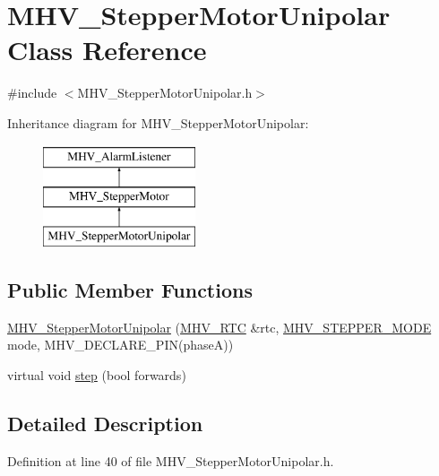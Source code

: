 \hypertarget{class_m_h_v___stepper_motor_unipolar}{
\section{\-M\-H\-V\-\_\-\-Stepper\-Motor\-Unipolar \-Class \-Reference}
\label{class_m_h_v___stepper_motor_unipolar}
}


{\ttfamily \#include $<$\-M\-H\-V\-\_\-\-Stepper\-Motor\-Unipolar.\-h$>$}

\-Inheritance diagram for \-M\-H\-V\-\_\-\-Stepper\-Motor\-Unipolar\-:\begin{figure}[H]
\begin{center}
\leavevmode
\includegraphics[height=3.000000cm]{class_m_h_v___stepper_motor_unipolar}
\end{center}
\end{figure}
\subsection*{\-Public \-Member \-Functions}
\begin{DoxyCompactItemize}
\item 
\hyperlink{class_m_h_v___stepper_motor_unipolar_ae2a28f4c01aeb049426bbd0b8eeee5be}{\-M\-H\-V\-\_\-\-Stepper\-Motor\-Unipolar} (\hyperlink{class_m_h_v___r_t_c}{\-M\-H\-V\-\_\-\-R\-T\-C} \&rtc, \hyperlink{_m_h_v___stepper_motor_unipolar_8h_a8983820d139e34ae75009f48ec2e6b83}{\-M\-H\-V\-\_\-\-S\-T\-E\-P\-P\-E\-R\-\_\-\-M\-O\-D\-E} mode, \-M\-H\-V\-\_\-\-D\-E\-C\-L\-A\-R\-E\-\_\-\-P\-I\-N(phase\-A))
\item 
virtual void \hyperlink{class_m_h_v___stepper_motor_unipolar_a11b7cc8dc9782b73ae93c70354158076}{step} (bool forwards)
\end{DoxyCompactItemize}


\subsection{\-Detailed \-Description}


\-Definition at line 40 of file \-M\-H\-V\-\_\-\-Stepper\-Motor\-Unipolar.\-h.



